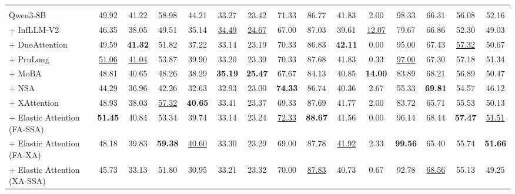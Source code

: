 \begin{table}[t]
{\begin{tabular}{l|ccccccccccccc|c}
\arrayrulecolor{black}\midrule
\rowcolor{blue!25}
\multicolumn{15}{c}{\textbf{Qwen3-8B backbone model}} \\
\arrayrulecolor{black!20}\midrule
Qwen3-8B & 49.92 & 41.22 & 58.98 & 44.21 & 33.27 & 23.42 & 71.33 & 86.77 & 41.83 & 2.00 & 98.33 & 66.31 & 56.08 & 52.16 \\
+ InfLLM-V2 & 46.35 & 38.05 & 49.51 & 35.14 & \underline{34.49} & \underline{24.67} & 67.00 & 87.03 & 39.61 & \underline{12.07} & 79.67 & 66.86 & 52.30 & 49.03 \\
+ DuoAttention & 49.59 & \textbf{41.32} & 51.82 & 37.22 & 33.14 & 23.19 & 70.33 & 86.83 & \textbf{42.11} & 0.00 & 95.00 & 67.43 & \underline{57.32} & 50.67 \\
+ PruLong & \underline{51.06} & \underline{41.04} & 53.87 & 39.90 & 33.20 & 23.39 & 70.33 & 87.68 & 41.83 & 0.33 & \underline{97.00} & 67.30 & 57.18 & 51.34 \\
+ MoBA & 48.81 & 40.65 & 48.26 & 38.29 & \textbf{35.19} & \textbf{25.47} & 67.67 & 84.13 & 40.85 & \textbf{14.00} & 83.89 & 68.21 & 56.89 & 50.47 \\
+ NSA & 44.29 & 36.96 & 42.26 & 32.63 & 32.93 & 23.00 & \textbf{74.33} & 86.74 & 40.36 & 2.67 & 55.33 & \textbf{69.81} & 54.57 & 46.12 \\
+ XAttention & 48.93 & 38.03 & \underline{57.32} & \textbf{40.65} & 33.41 & 23.37 & 69.33 & 87.69 & 41.77 & 2.00 & 83.72 & 65.71 & 55.53 & 50.13 \\
\arrayrulecolor{black!40}\midrule
+ Elastic Attention (FA-SSA) & \textbf{51.45} & 40.84 & 53.34 & 39.74 & 33.14 & 23.24 & \underline{72.33} & \textbf{88.67} & 41.56 & 0.00 & 96.14 & 68.44 & \textbf{57.47} & \underline{51.51} \\
+ Elastic Attention (FA-XA) & 48.18 & 39.83 & \textbf{59.38} & \underline{40.60} & 33.30 & 23.29 & 69.00 & 87.78 & \underline{41.92} & 2.33 & \textbf{99.56} & 65.40 & 55.74 & \textbf{51.66} \\
+ Elastic Attention (XA-SSA) & 45.73 & 33.13 & 51.80 & 30.95 & 33.21 & 23.32 & 70.00 & \underline{87.83} & 40.73 & 0.67 & 92.78 & \underline{68.56} & 55.13 & 49.25 \\


\end{tabular}}
\end{table}
